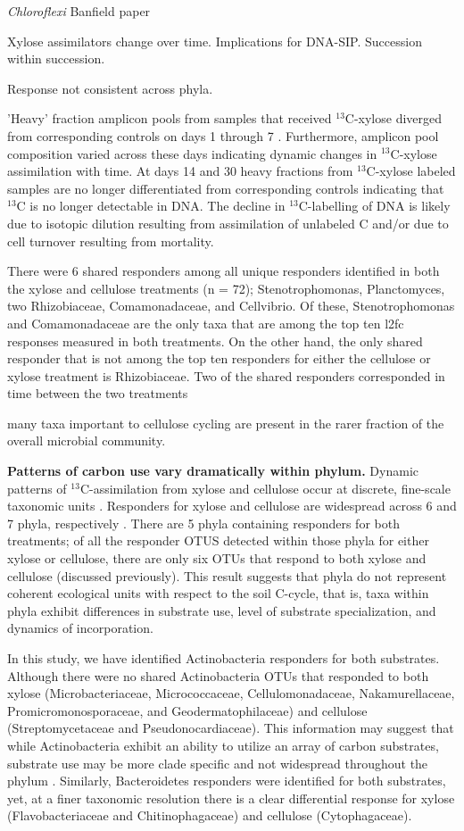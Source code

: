 \textit{Chloroflexi} Banfield paper

Xylose assimilators change over time. Implications for DNA-SIP. Succession within succession.

Response not consistent across phyla.

'Heavy' fraction amplicon pools from samples that received $^{13}$C-xylose
diverged from corresponding controls on days 1 through 7 . Furthermore,
amplicon pool composition varied across these days indicating dynamic changes
in $^{13}$C-xylose assimilation with time. At days 14 and 30 heavy fractions
from $^{13}$C-xylose labeled samples are no longer differentiated from
corresponding controls indicating that $^{13}$C is no longer detectable in DNA.
The decline in $^{13}$C-labelling of DNA is likely due to isotopic dilution
resulting from assimilation of unlabeled C and/or due to cell turnover
resulting from mortality. 

There were 6 shared responders among all unique responders identified in both
the xylose and cellulose treatments (n = 72); Stenotrophomonas, Planctomyces,
two Rhizobiaceae, Comamonadaceae, and Cellvibrio. Of these, Stenotrophomonas
and Comamonadaceae are the only taxa that are among the top ten l2fc responses
measured in both treatments. On the other hand, the only shared responder that
is not among the top ten responders for either the cellulose or xylose
treatment is Rhizobiaceae. Two of the shared responders corresponded in time
between the two treatments

many taxa important to cellulose cycling are present in the rarer fraction of the
overall microbial community.

\textbf{Patterns of carbon use vary dramatically within phylum.} Dynamic
patterns of $^{13}$C-assimilation from xylose and cellulose occur at discrete,
fine-scale taxonomic units . Responders for xylose and cellulose are widespread
across 6 and 7 phyla, respectively . There are 5 phyla containing responders
for both treatments; of all the responder OTUS detected within those phyla for
either xylose or cellulose, there are only six OTUs that respond to both xylose
and cellulose (discussed previously). This result suggests that phyla do not
represent coherent ecological units with respect to the soil C-cycle, that is,
taxa within phyla exhibit differences in substrate use, level of substrate
specialization, and dynamics of incorporation. 

In this study, we have identified Actinobacteria responders for both substrates. 
Although there were no shared Actinobacteria OTUs that responded to both
xylose (Microbacteriaceae, Micrococcaceae, Cellulomonadaceae, Nakamurellaceae,
Promicromonosporaceae, and Geodermatophilaceae) and cellulose
(Streptomycetaceae and Pseudonocardiaceae). This information may suggest that
while Actinobacteria exhibit an ability to utilize an array of carbon
substrates, substrate use may be more clade specific and not widespread
throughout the phylum . Similarly, Bacteroidetes responders were identified for
both substrates, yet, at a finer taxonomic resolution there is a clear
differential response for xylose (Flavobacteriaceae and Chitinophagaceae) and
cellulose (Cytophagaceae). 

